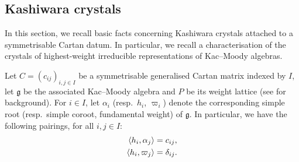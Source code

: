 \documentclass[a4paper,12pt]{article}
\theoremstyle{definition}
\theoremstyle{plain}
\theoremstyle{remark}
\begin{document}
\subsection{Kashiwara crystals}

In this section, we recall basic facts concerning Kashiwara crystals attached to a symmetrisable Cartan datum. In particular, we recall a characterisation of the crystals of highest-weight irreducible representations of Kac--Moody algebras.

Let $C = (c_{ij})_{i,j \in I}$ be a symmetrisable generalised Cartan matrix indexed by $I$, let $\mathfrak{g}$ be the associated Kac--Moody algebra and $P$ be its weight lattice (see \cite{Kac95} for background). For $i \in I$, let $\alpha_i$ (resp.\ $h_i$, $\varpi_i$) denote the corresponding simple root (resp.\ simple coroot, fundamental weight) of $\mathfrak{g}$. In particular, we have the following pairings, for all $i,j\in I$:
\begin{align}\label{pairings/rootscoroots}
\langle h_i,\alpha_j\rangle & =c_{ij}, \\
\langle h_i,\varpi_j\rangle & =\delta_{ij}. \notag
\end{align}
\end{document}
